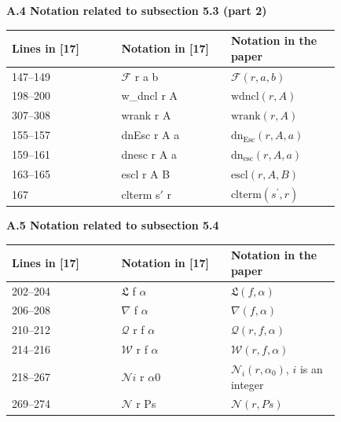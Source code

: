 \documentclass[10pt,a4paper]{amsart}
\begin{document}
 
 
 
\par\medskip\noindent\textbf{A.4 Notation related to subsection 5.3 (part 2)}\par
 
 
\begin{longtable}{|p{0.27666666666666667\linewidth}|p{0.27666666666666667\linewidth}|p{0.27666666666666667\linewidth}|}\hline
Lines in [17] & Notation in [17] & Notation in the paper \\ \hline
147–149 & $\mathcal{F}$ r a b & $\mathcal{F}(r,a,b)$ \\ \hline
198–200 & w\_dncl r A & $\mathrm{wdncl}(r,A)$ \\ \hline
307–308 & wrank r A & $\mathrm{wrank}(r,A)$ \\ \hline
155–157 & dnEsc r A a & $\mathrm{dn_{Esc}}(r,A,a)$ \\ \hline
159–161 & dnesc r A a & $\mathrm{dn_{esc}}(r,A,a)$ \\ \hline
163–165 & escl r A B & $\mathrm{escl}(r,A,B)$ \\ \hline
167 & clterm s\ensuremath{\prime} r & $\mathrm{clterm}(s^{\prime},r)$ \\ \hline
\end{longtable}
 
 
 
 
\par\medskip\noindent\textbf{A.5 Notation related to subsection 5.4}\par
 
 
\begin{longtable}{|p{0.27666666666666667\linewidth}|p{0.27666666666666667\linewidth}|p{0.27666666666666667\linewidth}|}\hline
Lines in [17] & Notation in [17] & Notation in the paper \\ \hline
202–204 & $\mathfrak{L}$ f $\alpha$ & $\mathfrak{L}(f,\alpha)$ \\ \hline
206–208 & $\nabla$ f $\alpha$ & $\nabla(f,\alpha)$ \\ \hline
210–212 & $\mathcal{Q}$ r f $\alpha$ & $\mathcal{Q}(r,f,\alpha)$ \\ \hline
214–216 & $\mathcal{W}$ r f $\alpha$ & $\mathcal{W}(r,f,\alpha)$ \\ \hline
218–267 & $\mathcal{N}i$ r $\alpha 0$ & $\mathcal{N}_{i}(r,\alpha_{0})$, $i$ is an integer \\ \hline
269–274 & $\mathcal{N}$ r Ps & $\mathcal{N}(r,Ps)$ \\ \hline
\end{longtable}
 
\end{document}
